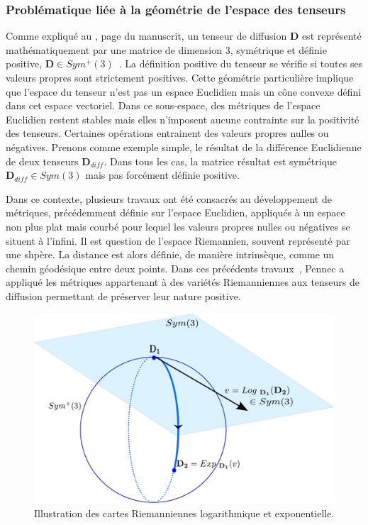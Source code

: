 \subsubsection*{Problématique liée à la géométrie de l'espace des tenseurs}
Comme expliqué au , page \pageref{Chapter1} du manuscrit, un tenseur de diffusion $\textbf{D}$ 
est représenté mathématiquement par une matrice de dimension 3, symétrique et définie positive, $\textbf{D} \in Sym^{+}(3)$~\cite{Basser1994}.
La définition positive du tenseur se vérifie si toutes ses valeurs propres sont strictement positives.
Cette géométrie particulière implique que l'espace du tenseur n'est pas un espace Euclidien mais un cône convexe défini dans cet espace vectoriel. 
Dans ce sous-espace, des métriques de l'espace Euclidien restent stables mais elles n'imposent aucune contrainte sur la positivité des tenseurs.
Certaines opérations entrainent des valeurs propres nulles ou négatives.
Prenons comme exemple simple, le résultat de la différence Euclidienne de deux tenseurs $\textbf{D}_{diff}$. 
Dans tous les cas, la matrice résultat est symétrique $\textbf{D}_{diff} \in Sym(3)$ mais pas forcément définie positive.

Dans ce contexte, plusieurs travaux ont été consacrés au développement de métriques, précédemment définie sur l'espace Euclidien, 
appliqués à un espace non plus \og plat \fg mais \og courbé \fg pour lequel les valeurs propres nulles ou négatives se situent à l'infini. 
Il est question de l'espace Riemannien, souvent représenté par une shpère.
La distance est alors définie, de manière intrinsèque, comme un chemin géodésique entre deux points.
Dans ces précédents travaux~\cite{Pennec1999,Pennec2004,Pennec2006}, Pennec a appliqué les métriques appartenant à des variétés Riemanniennes aux tenseurs de diffusion
permettant de préserver leur nature positive.

\begin{figure}[htpb]
    \centering
    \includegraphics[scale=0.6]{Images/log_exp_map_sphere.pdf}
    \caption{\label{fig_log_exp_map} Illustration des cartes Riemanniennes logarithmique et exponentielle.}
\end{figure}

